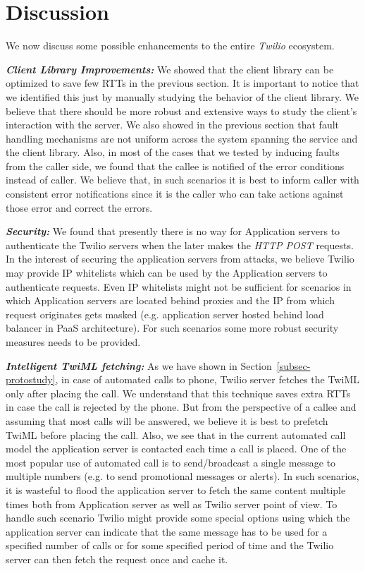 \section{Discussion}
\label{sec-discussion}
We now discuss some possible enhancements to the entire \textit{Twilio} ecosystem. 

\emph{\textbf{Client Library Improvements:}}
We showed that the client library can be optimized to save few RTTs in the previous section. It is important to notice that we identified this just by manually studying the behavior of the client library. We believe that there should be more robust and extensive ways to study the client's interaction with the server. We also showed in the previous section that fault handling mechanisms are not uniform across the system spanning the service and the client library. Also, in most of the cases that we tested by inducing faults from the caller side, we found that the callee is notified of the error conditions instead of caller. We believe that, in such scenarios it is best to inform caller with consistent error notifications since it is the caller who can take actions against those error and correct the errors.


\emph{\textbf{Security:}} We found that presently there is no way for Application servers to authenticate the Twilio servers when the later makes the \textit{HTTP POST} requests. In the interest of securing the application servers from attacks, we believe Twilio may provide IP whitelists which can be used by the Application servers to authenticate requests. Even IP whitelists might not be sufficient for scenarios in which Application servers are located behind proxies and the IP from which request originates gets masked (e.g. application server hosted behind load balancer in PaaS architecture). For such scenarios some more robust security measures needs to be provided.

\emph{\textbf{Intelligent TwiML fetching:}} As we have shown in Section~\ref{subsec-protostudy}, in case of automated calls to phone, Twilio server fetches the TwiML only after placing the call. We understand that this technique saves extra RTTs in case the call is rejected by the phone. But from the perspective of a callee and assuming that most calls will be answered, we believe it is best to prefetch TwiML before placing the call. Also, we see that in the current automated call model the application server is contacted each time a call is placed. One of the most popular use of automated call is to send/broadcast a single message to multiple numbers (e.g. to send promotional messages or alerts). In such scenarios, it is wasteful to flood the application server to fetch the same content multiple times both from Application server as well as Twilio server point of view. To handle such scenario Twilio might provide some special options using which the application server can indicate that the same message has to be used for a specified number of calls or for some specified period of time and the Twilio server can then fetch the request once and cache it.   
 